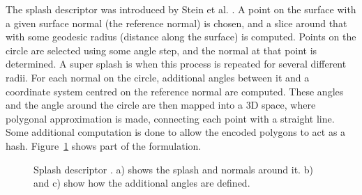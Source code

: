\documentclass[11pt,a4paper]{kth-mag}
\begin{document}
The splash descriptor was introduced by Stein et al. \cite{stein1992structural}.
A point on the surface with a given surface normal (the reference normal) is
chosen, and a slice around that with some geodesic radius (distance along the
surface) is computed. Points on the circle are selected using some angle step,
and the normal at that point is determined. A super splash is when this process
is repeated for several different radii. For each normal on the circle,
additional angles between it and a coordinate system centred on the reference
normal are computed. These angles and the angle around the circle are then
mapped into a 3D space, where polygonal approximation is made, connecting each
point with a straight line. Some additional computation is done to allow the
encoded polygons to act as a hash. Figure~\ref{fig:splash} shows part of the
formulation.

\begin{figure}
  \centering
  \caption{Splash descriptor \cite{stein1992structural}. a) shows the splash and
    normals around it. b) and c) show how the additional angles are defined.
  }
  \label{fig:splash}
\end{figure}
\end{document}
